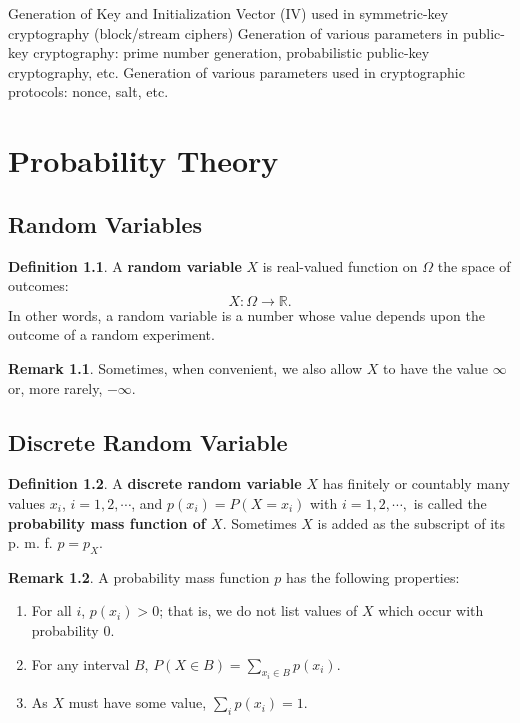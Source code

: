 \documentclass[12pt,openany]{book}
\theoremstyle{definition}
\newtheorem{definition}{Definition}[chapter]
\newtheorem{remark}{Remark}[chapter]
\begin{document}
	Generation of Key and Initialization Vector (IV) used in symmetric-key cryptography (block/stream ciphers)
	Generation of various parameters in public-key cryptography: prime number generation, probabilistic public-key cryptography, etc.
	Generation of various parameters used in cryptographic protocols: nonce, salt, etc.
	
	\newpage
	\chapter{Probability Theory}
	
	\section{Random Variables}
	\begin{tcolorbox}[colframe=defcolor,title={\color{white}\bf Random Variable}]
		\begin{definition}
			A \textbf{random variable} $X$ is real-valued function on $\Omega$ the space of outcomes: \[
			X:\Omega\to\mathbb{R}.
			\] In other words, a random variable is a number whose value depends upon the outcome of a random experiment.
		\end{definition}
	\end{tcolorbox}
	\begin{remark}
		Sometimes, when convenient, we also allow $X$ to have the value $\infty$ or, more rarely, $-\infty$.
	\end{remark}
	
	\section{Discrete Random Variable}
	\begin{tcolorbox}[colframe=defcolor,title={\color{white}\bf Discrete Random Variable}]
		\begin{definition}
			A \textbf{discrete random variable} $X$ has finitely or countably many values $x_i$, $i=1,2,\cdots$, and $p(x_i)=P(X=x_i)$ with $i=1,2,\cdots,$ is called the \textbf{probability mass function of $X$}. Sometimes $X$ is added as the subscript of its p. m. f. $p=p_X$.
		\end{definition}
	\end{tcolorbox}
	\begin{remark}
		A probability mass function $p$ has the following properties:\begin{enumerate}
			\item For all $i$, $p(x_i)>0$; that is, we do not list values of $X$ which occur with probability $0$.
			\item For any interval $B$, $P(X\in B)=\sum_{x_i\in B}p(x_i)$.
			\item As $X$ must have some value, $\sum_ip(x_i)=1$.
		\end{enumerate}
	\end{remark}
\end{document}
